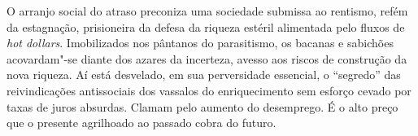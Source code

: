 O arranjo social do atraso preconiza uma sociedade submissa ao rentismo,
refém da estagnação, prisioneira da defesa da riqueza estéril alimentada
pelo fluxos de \emph{hot dollars}. Imobilizados nos pântanos do
parasitismo, os bacanas e sabichões acovardam"-se diante dos azares da
incerteza, avesso aos riscos de construção da nova riqueza. Aí está
desvelado, em sua perversidade essencial, o ``segredo'' das
reivindicações antissociais dos vassalos do enriquecimento sem esforço
cevado por taxas de juros absurdas. Clamam pelo aumento do desemprego.
É o alto preço que o presente agrilhoado ao passado cobra do
futuro.
